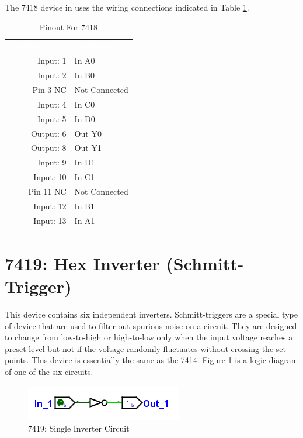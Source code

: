 The 7418 device in \LE uses the wiring connections indicated in Table \ref{tab:50-7418}.

\begin{table}[H]
	\sffamily
	\newcommand{\head}[1]{\textcolor{white}{\textbf{#1}}}		
	\begin{center}
		\begin{tabular}{rl} 
			\rowcolor{black!75}
			\head{Logisim Label} & \head{Function} \\
			Input: 1   & In A0  \\
			Input: 2   & In B0  \\
			Pin 3 NC   & Not Connected \\
			Input: 4   & In C0  \\
			Input: 5   & In D0  \\
			Output: 6  & Out Y0 \\
			Output: 8  & Out Y1 \\
			Input: 9   & In D1  \\
			Input: 10  & In C1  \\
			Pin 11 NC  & Not Connected \\
			Input: 12 & In B1  \\
			Input: 13  & In A1  \\
		\end{tabular}
	\end{center}
	\caption{Pinout For 7418}
	\label{tab:50-7418}
\end{table}

\section{7419: Hex Inverter (Schmitt-Trigger)}

This device contains six independent inverters. Schmitt-triggers are a special type of device that are used to filter out spurious noise on a circuit. They are designed to change from low-to-high or high-to-low only when the input voltage reaches a preset level but not if the voltage randomly fluctuates without crossing the set-points. This device is essentially the same as the 7414. Figure \ref{fig:50-7419} is a logic diagram of one of the six circuits.

\begin{figure}[H]
	\centering
	\includegraphics{gfx/50-7404}
	\caption{7419: Single Inverter Circuit}
	\label{fig:50-7419}
\end{figure}


